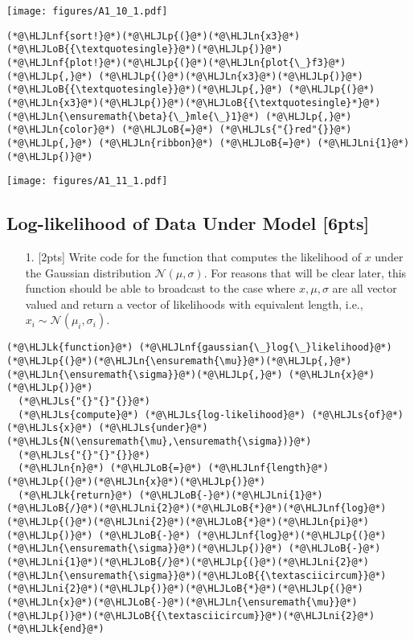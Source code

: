 \documentclass[12pt,a4paper]{article}
\newcommand{\HLJLk}[1]{\textcolor[RGB]{148,91,176}{\textbf{#1}}}
\newcommand{\HLJLn}[1]{#1}
\newcommand{\HLJLnf}[1]{\textcolor[RGB]{66,102,213}{#1}}
\newcommand{\HLJLs}[1]{\textcolor[RGB]{201,61,57}{#1}}
\newcommand{\HLJLni}[1]{\textcolor[RGB]{59,151,46}{#1}}
\newcommand{\HLJLoB}[1]{\textcolor[RGB]{102,102,102}{\textbf{#1}}}
\newcommand{\HLJLp}[1]{#1}
\begin{document}
\texttt{[image: figures/A1\_10\_1.pdf]}

\begin{lstlisting}
(*@\HLJLnf{sort!}@*)(*@\HLJLp{(}@*)(*@\HLJLn{x3}@*)(*@\HLJLoB{{\textquotesingle}}@*)(*@\HLJLp{)}@*)
(*@\HLJLnf{plot!}@*)(*@\HLJLp{(}@*)(*@\HLJLn{plot{\_}f3}@*)(*@\HLJLp{,}@*) (*@\HLJLp{(}@*)(*@\HLJLn{x3}@*)(*@\HLJLp{)}@*)(*@\HLJLoB{{\textquotesingle}}@*)(*@\HLJLp{,}@*) (*@\HLJLp{(}@*)(*@\HLJLn{x3}@*)(*@\HLJLp{)}@*)(*@\HLJLoB{{\textquotesingle}*}@*)(*@\HLJLn{\ensuremath{\beta}{\_}mle{\_}1}@*) (*@\HLJLp{,}@*)(*@\HLJLn{color}@*) (*@\HLJLoB{=}@*) (*@\HLJLs{"{}red"{}}@*)(*@\HLJLp{,}@*) (*@\HLJLn{ribbon}@*) (*@\HLJLoB{=}@*) (*@\HLJLni{1}@*)(*@\HLJLp{)}@*)
\end{lstlisting}

\texttt{[image: figures/A1\_11\_1.pdf]}

\subsection{Log-likelihood of Data Under Model [6pts]}
\begin{itemize}
\item[1. ] [2pts] Write code for the function that computes the likelihood of $x$ under the Gaussian distribution $\mathcal{N}(\ensuremath{\mu},\ensuremath{\sigma})$.  For reasons that will be clear later, this function should be able to broadcast to the case where $x, \mu, \sigma$ are all vector valued  and return a vector of likelihoods with equivalent length, i.e., $x_i \sim \mathcal{N}(\mu_i,\sigma_i)$.

\end{itemize}

\begin{lstlisting}
(*@\HLJLk{function}@*) (*@\HLJLnf{gaussian{\_}log{\_}likelihood}@*)(*@\HLJLp{(}@*)(*@\HLJLn{\ensuremath{\mu}}@*)(*@\HLJLp{,}@*) (*@\HLJLn{\ensuremath{\sigma}}@*)(*@\HLJLp{,}@*) (*@\HLJLn{x}@*)(*@\HLJLp{)}@*)
  (*@\HLJLs{"{}"{}"{}}@*)
  (*@\HLJLs{compute}@*) (*@\HLJLs{log-likelihood}@*) (*@\HLJLs{of}@*) (*@\HLJLs{x}@*) (*@\HLJLs{under}@*) (*@\HLJLs{N(\ensuremath{\mu},\ensuremath{\sigma})}@*)
  (*@\HLJLs{"{}"{}"{}}@*)
  (*@\HLJLn{n}@*) (*@\HLJLoB{=}@*) (*@\HLJLnf{length}@*)(*@\HLJLp{(}@*)(*@\HLJLn{x}@*)(*@\HLJLp{)}@*)
  (*@\HLJLk{return}@*) (*@\HLJLoB{-}@*)(*@\HLJLni{1}@*)(*@\HLJLoB{/}@*)(*@\HLJLni{2}@*)(*@\HLJLoB{*}@*)(*@\HLJLnf{log}@*)(*@\HLJLp{(}@*)(*@\HLJLni{2}@*)(*@\HLJLoB{*}@*)(*@\HLJLn{pi}@*)(*@\HLJLp{)}@*) (*@\HLJLoB{-}@*) (*@\HLJLnf{log}@*)(*@\HLJLp{(}@*)(*@\HLJLn{\ensuremath{\sigma}}@*)(*@\HLJLp{)}@*) (*@\HLJLoB{-}@*) (*@\HLJLni{1}@*)(*@\HLJLoB{/}@*)(*@\HLJLp{(}@*)(*@\HLJLni{2}@*)(*@\HLJLn{\ensuremath{\sigma}}@*)(*@\HLJLoB{{\textasciicircum}}@*)(*@\HLJLni{2}@*)(*@\HLJLp{)}@*)(*@\HLJLoB{*}@*)(*@\HLJLp{(}@*)(*@\HLJLn{x}@*)(*@\HLJLoB{-}@*)(*@\HLJLn{\ensuremath{\mu}}@*)(*@\HLJLp{)}@*)(*@\HLJLoB{{\textasciicircum}}@*)(*@\HLJLni{2}@*)
(*@\HLJLk{end}@*)
\end{lstlisting}
\end{document}
